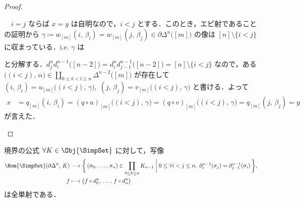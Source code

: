\documentclass[TQFT_main]{subfiles}
\begin{document}
\begin{proof}
\begin{description}
        　$i=j$ ならば $x = y$ は自明なので，$i < j$ とする．このとき，エピ射であることの証明から $\gamma \coloneqq w_{[m]} (i,\, \beta_i) = w_{[m]} (j,\, \beta_j) \in \partial \Delta^n \bigl( [m] \bigr)$ の像は $[n] \setminus \{i < j\}$ に収まっている．i.e. $\gamma$ は
        \begin{center}
        \end{center}
        と分解する．$d^n_j d^{n-1}_i \bigl( [n-2] \bigr) = d^n_i d^{n-1}_{j-1} \bigl( [n-2] \bigr) = {[n]} \setminus \{i < j\}$ なので，ある $\bigl( (i < j),\, \alpha \bigr) \in \coprod_{0 \le k < l \le n} \Delta^{n-2} \bigl( [m] \bigr)$ が存在して $(i,\, \beta_i) = u_{[m]} \bigl((i < j),\, \gamma\bigr),\; (j,\, \beta_j) = v_{[m]} \bigl((i < j),\, \gamma\bigr)$ と書ける．よって
        \begin{align}
            x &= q_{[m]} (i,\, \beta_i) = (q \circ u)_{[m]} \bigl( (i < j),\, \gamma \bigr) = (q \circ v)_{[m]} \bigl( (i < j),\, \gamma \bigr) = q_{[m]} (j,\, \beta_j) = y
        \end{align}
        が言えた．
    \end{description}
\end{proof}

\begin{mycol}[label=col:coundary-coeq]{境界の公式}
    $\forall K \in \Obj{\SimpSet}$ に対して，写像
    \begin{align}
        \Hom{\SimpSet} (\partial \Delta^n,\, K) &\lto \biggl\{\, (\sigma_0,\, \dots,\, \sigma_n) \in \prod_{0 \le k \le n} K_{n-1} \biggm| 0 \le \forall i < j \le n,\;  \partial^{n-1}_i (\sigma_j) = \partial^{n-1}_{j-1} (\sigma_i) \,\biggr\}, \\
        f &\lmto \bigl(f \circ d^n_0,\, \dots,\, f \circ d^n_n \bigr) 
    \end{align}
    は全単射である．
\end{mycol}
\end{document}
